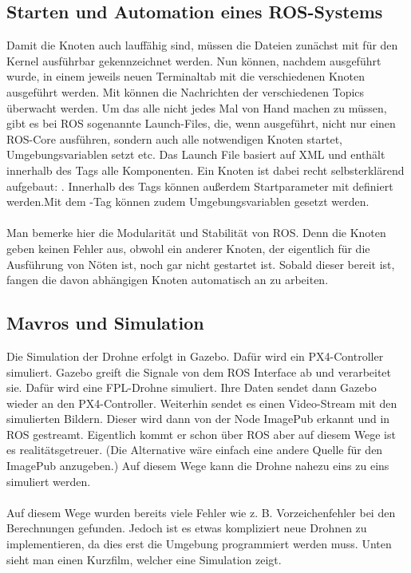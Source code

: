 \subsection{Starten und Automation eines ROS-Systems}
Damit die Knoten auch lauffähig sind, müssen die Dateien zunächst mit  für den Kernel ausführbar gekennzeichnet werden. Nun können, nachdem  ausgeführt wurde, in einem jeweils neuen Terminaltab mit  die verschiedenen Knoten ausgeführt werden. Mit  können die Nachrichten der verschiedenen Topics überwacht werden. Um das alle nicht jedes Mal von Hand machen zu müssen, gibt es bei ROS sogenannte Launch-Files, die, wenn ausgeführt, nicht nur einen ROS-Core ausführen, sondern auch alle notwendigen Knoten startet, Umgebungsvariablen setzt etc. Das Launch File basiert auf XML und enthält innerhalb des  Tags alle Komponenten. Ein Knoten ist dabei recht selbsterklärend aufgebaut: . Innerhalb des Tags können außerdem Startparameter mit  definiert werden.Mit dem -Tag können zudem Umgebungsvariablen gesetzt werden. 

\paragraph{}
Man bemerke hier die Modularität und Stabilität von ROS. Denn die Knoten geben keinen Fehler aus, obwohl ein anderer Knoten, der eigentlich für die Ausführung von Nöten ist, noch gar nicht gestartet ist. Sobald dieser bereit ist, fangen die davon abhängigen Knoten automatisch an zu arbeiten. 

\subsection{Mavros und Simulation}
Die Simulation der Drohne erfolgt in Gazebo. Dafür wird ein PX4-Controller simuliert. Gazebo greift die Signale von dem ROS Interface ab und verarbeitet sie. Dafür wird eine FPL-Drohne simuliert. Ihre Daten sendet dann Gazebo wieder an den PX4-Controller. Weiterhin sendet es einen Video-Stream mit den simulierten Bildern. Dieser wird dann von der Node ImagePub erkannt und in ROS gestreamt. Eigentlich kommt er schon über ROS aber auf diesem Wege ist es realitätsgetreuer. (Die Alternative wäre einfach eine andere Quelle für den ImagePub anzugeben.) Auf diesem Wege kann die Drohne nahezu eins zu eins simuliert werden. \\
\\
Auf diesem Wege wurden bereits viele Fehler wie z. B. Vorzeichenfehler bei den Berechnungen gefunden. Jedoch ist es etwas kompliziert neue Drohnen zu implementieren, da dies erst die Umgebung programmiert werden muss. Unten sieht man einen Kurzfilm, welcher eine Simulation zeigt.
